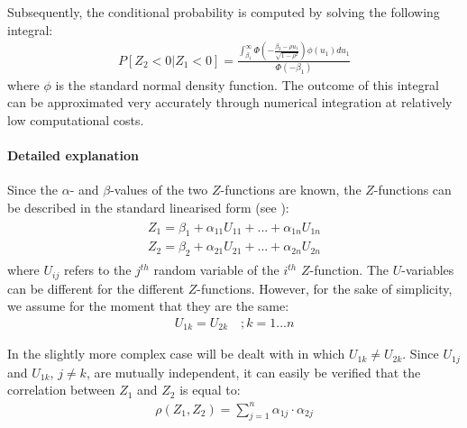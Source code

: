 Subsequently, the conditional probability is computed by solving the following integral:
\begin{align}
P\left[Z_{2} <0|Z_{1} <0\right]=\frac{\int _{\beta _{1} }^{\infty }\Phi \left(-\frac{\beta _{2} -\rho u_{1} }{\sqrt{1-\rho ^{2} } } \right)\phi \left(u_{1} \right)du_{1}  }{\Phi \left(-\beta _{1} \right)} \label{eq:2-74} 
\end{align}
where $\phi$ is the standard normal density function. The outcome of this integral can be approximated very accurately through numerical integration at relatively low computational costs.

\paragraph*{Detailed explanation}

Since the $\alpha$- and $\beta$-values of the two $Z$-functions are known, the $Z$-functions can be described in the standard linearised form (see ):
\begin{align}
\begin{array}{l} {Z_{1} =\beta _{1} +\alpha _{11} U_{11} +...+\alpha _{1n} U_{1n} } \\ {Z_{2} =\beta _{2} +\alpha _{21} U_{21} +...+\alpha _{2n} U_{2n} } \end{array} \label{0.72)} 
\end{align}
where $U_{ij}$ refers to the $j^{th}$ random variable of the $i^{th}$ $Z$-function. The $U$-variables can be different for the different $Z$-functions. However, for the sake of simplicity, we assume for the moment that they are the same: 
\begin{align}
U_{1k} =U_{2k} \quad ;k=1...n \label{0.73)} 
\end{align}

In  the slightly more complex case will be dealt with in which $U_{1k}$$\neq$$U_{2k}$. Since $U_{1j}$ and $U_{1k}$, $j\neq k$, are mutually independent, it can easily be verified that the correlation between $Z_1$ and $Z_2$ is equal to:
\begin{align}
\rho \left(Z_{1} ,Z_{2} \right)=\sum _{j=1}^{n}\alpha _{1j} \cdot \alpha _{2j}  \label{eq:2-77} 
\end{align}

